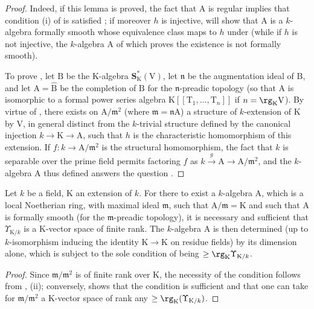 \begin{proof}
Indeed, if this lemma is proved, the fact that $\mathrm{A}$ is regular implies that condition (i) of  is satisfied ; if moreover $h$ is injective,  will show that $\mathrm{A}$ is a $k$-algebra formally smooth whose equivalence class maps to $h$ under  (while if $h$ is not injective, the $k$-algebra $\mathrm{A}$ of which  proves the existence is not formally smooth).

To prove , let $\mathrm{B}$ be the $\mathrm{K}$-algebra $\mathbf{S}^*_\mathrm{K}(\mathrm{V})$, let $\mathfrak{n}$ be the augmentation ideal of $\mathrm{B}$, and let $\mathrm{A}=\widehat{\mathrm{B}}$ be the completion of $\mathrm{B}$ for the $\mathfrak{n}$-preadic topology (so that $\mathrm{A}$ is isomorphic to a formal power series algebra $\mathrm{K}[[\mathrm{T}_1,\ldots,\mathrm{T}_n]]$ if $n=\rg_\mathrm{K}\mathrm{V}$).
By virtue of , there exists on $\mathrm{A}/\mathfrak{m}^2$ (where $\mathfrak{m}=\mathfrak{n}\mathrm{A}$) a structure of $k$-extension of $\mathrm{K}$ by $\mathrm{V}$, in general distinct from the $k$-trivial structure defined by the canonical injection $k\to\mathrm{K}\to\mathrm{A}$, such that $h$ is the characteristic homomorphism of this extension.
If $f:k\to\mathrm{A}/\mathfrak{m}^2$ is the structural homomorphism, the fact that $k$ is separable over the prime field permits  factoring $f$ as $k\xrightarrow{g}\mathrm{A}\to\mathrm{A}/\mathfrak{m}^2$, and the $k$-algebra $\mathrm{A}$ thus defined answers the question .
\end{proof}

\begin{theorem}[22.2.6]
\label{0.22.2.6}
Let $k$ be a field, $\mathrm{K}$ an extension of $k$.
For there to exist a $k$-algebra $\mathrm{A}$, which is a local Noetherian ring, with maximal ideal $\mathfrak{m}$, such that $\mathrm{A}/\mathfrak{m}=\mathrm{K}$ and such that $\mathrm{A}$ is formally smooth (for the $\mathfrak{m}$-preadic topology), it is necessary and sufficient that $\Upsilon_{\mathrm{K}/k}$ is a $\mathrm{K}$-vector space of finite rank.
The $k$-algebra $\mathrm{A}$ is then determined (up to $k$-isomorphism inducing the identity $\mathrm{K}\to\mathrm{K}$ on residue fields) by its dimension alone, which is subject to the sole condition of being $\geq\rg_\mathrm{K}\Upsilon_{\mathrm{K}/k}$.
\end{theorem}

\begin{proof}
Since $\mathfrak{m}/\mathfrak{m}^2$ is of finite rank over $\mathrm{K}$, the necessity of the condition follows from , (ii); conversely,  shows that the condition is sufficient and that one can take for $\mathfrak{m}/\mathfrak{m}^2$ a $\mathrm{K}$-vector space of rank any $\geq\rg_\mathrm{K}(\Upsilon_{\mathrm{K}/k})$.
\end{proof}

